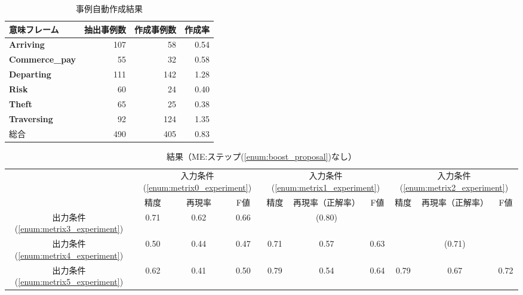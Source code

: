 \documentclass[japanese]{jnlp_1.2b}
\begin{document}
\begin{table}[b]
 \begin{center}
  \caption{事例自動作成結果}
  \label{tbl:boost_result_discussion}
  \begin{tabular}{lrrr}
   \hline
   意味フレーム & 抽出事例数 & 作成事例数 & 作成率 \\
   \hline
   {\bf Arriving}   & 107 & 58  & 0.54 \\
   {\bf Commerce\_pay} & 55 & 32 & 0.58 \\
   {\bf Departing}  & 111 & 142 & 1.28 \\
   {\bf Risk} & 60  & 24  & 0.40 \\
   {\bf Theft}      & 65 & 25 & 0.38 \\
   {\bf Traversing} & 92  & 124 & 1.35 \\
   \hline
   総合 & 490 & 405 & 0.83 \\
   \hline
  \end{tabular}
 \end{center}
\end{table}
\begin{table}[b]
 \begin{center}
  \caption{結果（ME:ステップ(\ref{enum:boost_proposal})なし）}
  \label{tbl:result_allnb_experiment_me}
  \setlength{\tabcolsep}{1.5mm}
  \begin{tabular}{c|ccc|ccc|ccc}
   \hline
   & \multicolumn{3}{|c|}{入力条件(\ref{enum:metrix0_experiment})}
   & \multicolumn{3}{|c|}{入力条件(\ref{enum:metrix1_experiment})}
   & \multicolumn{3}{|c}{入力条件(\ref{enum:metrix2_experiment})} \\
   & 精度 & 再現率 & F値
   & 精度 & 再現率（正解率） & F値
   & 精度 & 再現率（正解率） & F値 \\
   \hline
   出力条件(\ref{enum:metrix3_experiment}) & 0.71 & 0.62 & 0.66  &  &
   (0.80) &  &  &  & \\
   出力条件(\ref{enum:metrix4_experiment})& 0.50 & 0.44 & 0.47 & 0.71 &
   0.57 & 0.63  &  & (0.71) & \\
   出力条件(\ref{enum:metrix5_experiment}) & 0.62 & 0.41 & 0.50  & 0.79
   & 0.54 & 0.64  & 0.79 & 0.67 & 0.72 \\
   \hline
  \end{tabular}
 \end{center}
\end{table}
\end{document}
